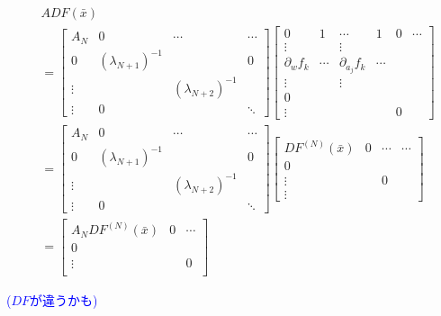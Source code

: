 \documentclass[11pt,a4paper]{jsarticle}
\theoremstyle{definition}
\begin{document}
\begin{equation}
  \begin{split}
    &ADF(\bar{x}) \\
    &= \begin{bmatrix}
      A_N & 0  & \cdots & \cdots  \\
      0 & (\lambda_{N+1})^{-1} & & 0 \\
      \vdots &               & (\lambda_{N+2})^{-1} & \\
      \vdots & 0 & & \ddots
    \end{bmatrix}
    \begin{bmatrix}
      0 & 1  & \cdots & 1 & 0 & \cdots \\
      \vdots & & \vdots & & & \\
      \partial_w f_k & \cdots & \partial_{a_j}f_k & \cdots & & \\
      \vdots & & \vdots & & & \\
      0 & & & & &  \\
      \vdots & & & &0 &
   \end{bmatrix}\\
    &= \begin{bmatrix}
      A_N & 0  & \cdots & \cdots  \\
      0 & (\lambda_{N+1})^{-1} & & 0 \\
      \vdots & & (\lambda_{N+2})^{-1} & \\
      \vdots & 0 & & \ddots
    \end{bmatrix}
    \begin{bmatrix}
      DF^{(N)}{(\bar{x})} & 0  & \cdots & \cdots \\
      0 & & & \\
      \vdots & & 0 & \\
      \vdots & & &
   \end{bmatrix}\\
    &=
    \begin{bmatrix}
        A_N DF^{(N)}(\bar{x}) & 0 & \cdots \\
        0 & & \\
        \vdots & & 0 \\
    \end{bmatrix}
  \end{split}
\end{equation}

\textcolor{blue}{($DF$が違うかも)}
\end{document}
